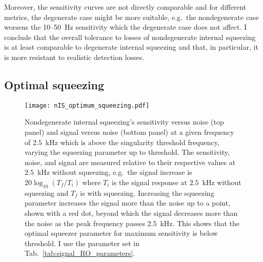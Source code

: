 Moreover, the sensitivity curves are not directly comparable and for different metrics, the degenerate case might be more suitable, e.g.\ the nondegenerate case worsens the 10--50~Hz sensitivity which the degenerate case does not affect. %
I conclude that the overall tolerance to losses of nondegenerate internal squeezing is at least comparable to degenerate internal squeezing and that, in particular, it is more resistant to realistic detection losses.


\subsection{Optimal squeezing}
\label{sec:nIS_optimal_squeezing}

\begin{figure}[ht]
	\centering
	\texttt{[image: nIS\_optimum\_squeezing.pdf]}
	\caption{ Nondegenerate internal squeezing's sensitivity versus noise (top panel) and signal versus noise (bottom panel) at a given frequency of $2.5$~kHz which is above the singularity threshold frequency, varying the squeezing parameter up to threshold. The sensitivity, noise, and signal are measured relative to their respective values at $2.5$~kHz without squeezing, e.g.\ the signal increase is $20\log_{10}(T_f/T_i)$ where $T_i$ is the signal response at $2.5$~kHz without squeezing and $T_f$ is with squeezing. Increasing the squeezing parameter increases the signal more than the noise up to a point, shown with a red dot, beyond which the signal decreases more than the noise as the peak frequency passes $2.5$~kHz. This shows that the optimal squeezer parameter for maximum sensitivity is below threshold. I use the parameter set in Tab.~\ref{tab:signal_RO_parameters}.
    }
	\label{fig:nIS_optimum_squeezing}
\end{figure}

